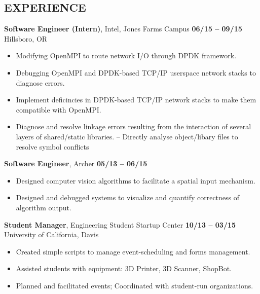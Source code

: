 \documentclass[line, letterpaper, 10pt]{res}
\begin{document}
\begin{resume}
\section{EXPERIENCE}

    {\bf Software Engineer (Intern)}, Intel, Jones Farms Campus \hfill {\bf 06/15 -- 09/15} \\
    Hillsboro, OR
    \begin{itemize} \itemsep -2pt
        \item Modifying OpenMPI to route network I/O through DPDK framework.
        \item Debugging OpenMPI and DPDK-based TCP/IP userspace network stacks to diagnose errors.
        \item Implement deficincies in DPDK-based TCP/IP network stacks to make them compatible with OpenMPI.
        \item Diagnose and resolve linkage errors resulting from the interaction of several layers of shared/static libraries.
            \subitem -- Directly analyse object/libary files to resolve symbol conflicts
    \end{itemize}

    {\bf Software Engineer}, Archer \hfill {\bf 05/13 -- 06/15}
    \begin{itemize} \itemsep -2pt %
        \item Designed computer vision algorithms to facilitate a spatial input mechanism.
        \item Designed and debugged systems to visualize and quantify correctness of algorithm output.
    \end{itemize}

    {\bf Student Manager}, Engineering Student Startup Center \hfill {\bf 10/13 -- 03/15} \\
    University of California, Davis
    \begin{itemize} \itemsep -2pt %
        \item Created simple scripts to manage event-scheduling and forms management.
        \item Assisted students with equipment: 3D Printer, 3D Scanner, ShopBot.
        \item Planned and facilitated events; Coordinated with student-run organizations.
    \end{itemize}


\end{resume}
\end{document}
